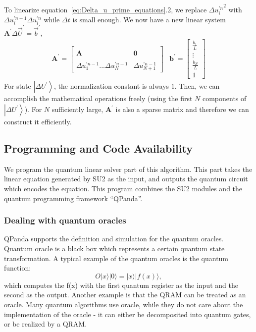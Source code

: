 \documentclass[%
 reprint,
 amsmath,amssymb,
pra,
]{revtex4-1}
\begin{document}
To linearize equation~\ref{eq:Delta_u_prime_equations}.2, we replace ${\Delta u^{\prime n}_i}^2$ with $\Delta u^{\prime n - 1}_i \Delta u^{\prime n}_i$ while $\Delta t$ is small enough. We now have a new linear system $\bm{A^{\prime}} \Delta \vec{U}^{\prime} = \vec{b}^{\prime}$,
\begin{equation}
\begin{array}{cc}
\bm{A^{\prime}} = \left[
\begin{array}{cc}
  &\\
  \bm{A} & \bm{0}\\
  &\\
  \Delta u^{\prime n - 1}_1...\Delta u^{\prime n - 1}_N&\Delta u^{\prime n - 1}_{N+1}
\end{array}
\right]
&
\bm{b^{\prime}} = \left[
\begin{array}{c}
  \frac{b_1}{L}\\
  \vdots\\
  \frac{b_N}{L}\\
  1
\end{array}
\right]
\end{array}
\end{equation}
For state $\left|\Delta U^{\prime}\right\rangle$, the normalization constant is always $1$. Then, we can accomplish the mathematical operations freely (using the first $N$ components of $\left|\Delta U^{\prime}\right\rangle$). For $N$ sufficiently large, $\bm{A^{\prime}}$ is also a sparse matrix and therefore we can construct it efficiently.

\subsection{Programming and Code Availability}
We program the quantum linear solver part of this algorithm. This part takes the linear equation generated by SU2 as the input, and outputs the quantum circuit which encodes the equation. This program combines the SU2 modules and the quantum programming framework ``QPanda''.

\subsubsection{Dealing with quantum oracles}
QPanda supports the definition and simulation for the quantum oracles. Quantum oracle is a black box which represents a certain quantum state transformation. A typical example of the quantum oracles is the quantum function:
\begin{equation}
	O|x\rangle|0\rangle = |x\rangle|f(x)\rangle,
\end{equation} 
which computes the f(x) with the first quantum register as the input and the second as the output. Another example is that the  QRAM can be treated as an oracle. Many quantum algorithms use oracle, while they do not care about the implementation of the oracle - it can either be decomposited into quantum gates, or be realized by a QRAM.
\end{document}
